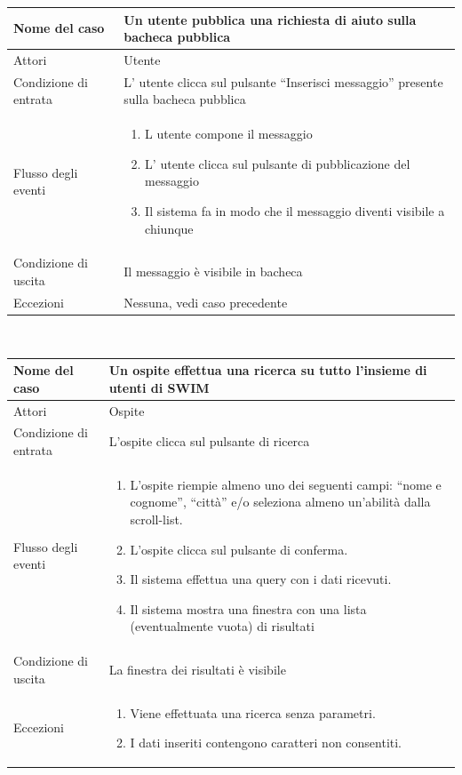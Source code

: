 \documentclass[a4paper,12pt]{article}
\begin{document}
\begin{tabularx}{\textwidth}{|l|X|}
\hline Nome del caso & Un utente pubblica una richiesta di aiuto sulla bacheca pubblica \\
\hline Attori & Utente \\ 
\hline Condizione di entrata & L' utente clicca sul pulsante “Inserisci messaggio” presente sulla bacheca pubblica \\
\hline Flusso degli eventi & 
\begin{enumerate}
\itemsep0em 
\item L utente compone il messaggio
\item L' utente clicca sul pulsante di pubblicazione del messaggio
\item Il sistema fa in modo che il messaggio diventi visibile a chiunque
\end{enumerate}
 \\ 
\hline Condizione di uscita & Il messaggio è visibile in bacheca \\
\hline Eccezioni & Nessuna, vedi caso precedente
\\
\hline 
\end{tabularx} \\[1\baselineskip]
\begin{tabularx}{\textwidth}{|l|X|}
\hline Nome del caso & Un ospite effettua una ricerca su tutto l'insieme di utenti di SWIM \\
\hline Attori & Ospite \\ 
\hline Condizione di entrata & L'ospite clicca sul pulsante di ricerca \\
\hline Flusso degli eventi & 
\begin{enumerate}
\itemsep0em 
\item L'ospite riempie almeno uno dei seguenti campi: “nome e cognome”, “città” e/o seleziona almeno un'abilità dalla scroll-list.
\item L'ospite clicca sul pulsante di conferma.
\item Il sistema effettua una query con i dati ricevuti.
\item Il sistema mostra una finestra con una lista (eventualmente vuota) di risultati
\end{enumerate}
 \\ 
\hline Condizione di uscita & La finestra dei risultati è visibile \\
\hline Eccezioni &
\begin{enumerate}
\itemsep0em
\item Viene effettuata una ricerca senza parametri.
\item I dati inseriti contengono caratteri non consentiti.
\end{enumerate}
\\
\hline 
\end{tabularx} \clearpage
\end{document}

